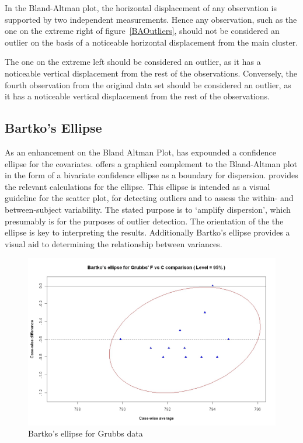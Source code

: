 \documentclass[12pt, a4paper]{report}
\theoremstyle{plain}
\theoremstyle{definition}
\theoremstyle{remark}
\begin{document}
	
	In the Bland-Altman plot, the horizontal displacement of any observation is supported by two independent measurements. Hence any observation, such as the one on the extreme right of figure~\ref{BAOutliers}, should not be considered an outlier on the basis of a noticeable horizontal displacement from the main cluster. 
	
	The one	on the extreme left should be considered an outlier, as it has a noticeable vertical displacement from the rest of the observations. Conversely, the fourth observation from the original data set should be considered an outlier, as it has a noticeable vertical displacement from the rest of the observations.
	
	\subsection{Bartko's Ellipse}
	
	As an enhancement on the Bland Altman Plot, \citet{Bartko} has
	expounded a confidence ellipse for the covariates. \citet{Bartko} offers a graphical complement to the Bland-Altman
	plot in the form of a bivariate confidence ellipse as a boundary for dispersion. \citet{AltmanEllipse} provides the relevant calculations for the ellipse. This ellipse is intended as a visual
	guideline for the scatter plot, for detecting outliers and to
	assess the within- and between-subject variability. The stated purpose is to `amplify dispersion', which presumably is for the purposes of outlier detection. The orientation of the the ellipse is key to interpreting the results.
	Additionally Bartko's ellipse provides a visual aid to determining the
	relationship between variances. 
	
	
	
	\begin{figure}[h!]
		\includegraphics[width=130mm]{images/GrubbsBartko.jpeg}
		\caption{Bartko's ellipse for Grubbs data}\label{GrubbsBartko}
	\end{figure}
	
\end{document}
